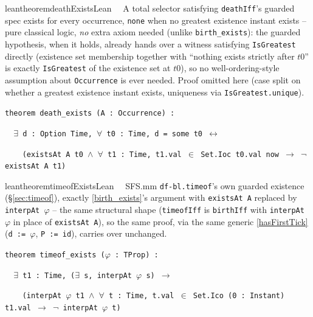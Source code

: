 \begin{restatable}{leantheorem}{deathExistsLean}~~ A total selector satisfying
\texttt{deathIff}'s guarded spec exists for every occurrence, \texttt{none} when no greatest existence instant
exists -- pure classical logic, \emph{no} extra axiom needed (unlike \texttt{birth\_exists}): the guarded
hypothesis, when it holds, already hands over a witness satisfying \texttt{IsGreatest} directly (existence set
membership together with ``nothing exists strictly after $t0$'' is exactly \texttt{IsGreatest} of the
existence set at $t0$), so no well-ordering-style assumption about \texttt{Occurrence} is ever needed. Proof
omitted here (case split on whether a greatest existence instant exists, uniqueness via
\texttt{IsGreatest.unique}).

\texttt{\textcolor{leancolor}{theorem} \textcolor{leanyellow}{death\_exists} (A : Occurrence) :}

\texttt{~~$\exists$ d : Option Time, $\forall$ t0 : Time, d = some t0 $\leftrightarrow$}

\texttt{~~~~(existsAt A t0 $\wedge$ $\forall$ t1 : Time, t1.val $\in$ Set.Ioc t0.val now $\to$ $\lnot$ existsAt A t1)}
\label{death_exists}
\end{restatable}

\begin{restatable}{leantheorem}{timeofExistsLean}~~ SFS.mm \texttt{df-bl.timeof}'s own
guarded existence (\S\ref{sec:timeof}), exactly \ref{birth_exists}'s argument with \texttt{existsAt A} replaced
by \texttt{interpAt $\varphi$} -- the same structural shape (\texttt{timeofIff} is \texttt{birthIff} with
\texttt{interpAt $\varphi$} in place of \texttt{existsAt A}), so the same proof, via the same generic
\ref{hasFirstTick} (\texttt{d := $\varphi$}, \texttt{P := id}), carries over unchanged.

\texttt{\textcolor{leancolor}{theorem} \textcolor{leanyellow}{timeof\_exists} ($\varphi$ : TProp) :}

\texttt{~~$\exists$ t1 : Time, ($\exists$ s, interpAt $\varphi$ s) $\to$}

\texttt{~~~~(interpAt $\varphi$ t1 $\wedge$ $\forall$ t : Time, t.val $\in$ Set.Ico (0 : Instant) t1.val $\to$ $\lnot$ interpAt $\varphi$ t)}
\label{timeof_exists}
\end{restatable}

